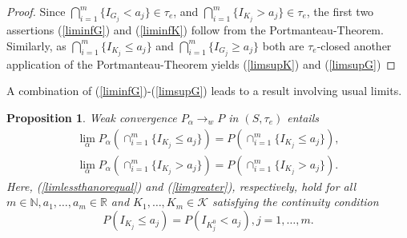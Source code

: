 \documentclass[sn-mathphys,Numbered]{sn-jnl}%
\theoremstyle{thmstyleone}%
\newtheorem{proposition}[theorem]{Proposition}%
\theoremstyle{thmstyletwo}%
\theoremstyle{thmstylethree}%
\begin{document}
\begin{proof} Since $\bigcap_{i=1}^m \{I_{G_j} < a_j\} \in \tau_e$, and $\bigcap_{i=1}^m \{I_{K_j} > a_j\} \in \tau_e$,  the first two assertions (\ref{liminfG}) and (\ref{liminfK}) follow from the Portmanteau-Theorem.
Similarly, as $\bigcap_{i=1}^m \{I_{K_j} \le a_j\}$ and  $\bigcap_{i=1}^m \{I_{G_j} \ge a_j\}$ both are $\tau_e$-closed another application of the Portmanteau-Theorem yields (\ref{limsupK}) and (\ref{limsupG})
\end{proof}

A combination of (\ref{liminfG})-(\ref{limsupG}) leads to a result involving usual limits.\\

\begin{proposition} \label{necessary} Weak convergence $P_\alpha \rightarrow_w P$ in $(S,\tau_e)$ entails
\begin{align}
 \lim_\alpha P_\alpha(\cap_{i=1}^m \{I_{K_j} \le a_j\}) = P(\cap_{i=1}^m \{I_{K_j} \le a_j\}), \label{limlessthanorequal} \\
 \lim_\alpha P_\alpha(\cap_{i=1}^m \{I_{K_j} > a_j\}) = P(\cap_{i=1}^m \{I_{K_j} > a_j\}). \label{limgreater}
\end{align}
Here, (\ref{limlessthanorequal}) and (\ref{limgreater}), respectively, hold for all $m \in \mathbb{N}, a_1,\ldots,a_m \in \mathbb{R}$ and
$K_1,\ldots,K_m \in \mathcal{K}$ satisfying the continuity condition
$$
  P(I_{K_j} \le a_j)=P(I_{K_j^0} < a_j), j=1,\ldots,m.
$$
\end{proposition}
\end{document}
